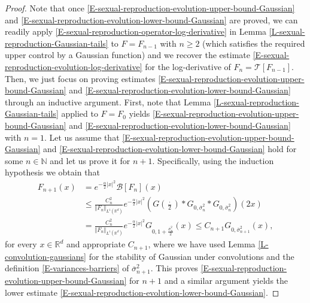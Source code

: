 \documentclass[reqno]{amsart}
\numberwithin{equation}{section}
\begin{document}
{\begin{proof} Note that once \eqref{E-sexual-reproduction-evolution-upper-bound-Gaussian} and \eqref{E-sexual-reproduction-evolution-lower-bound-Gaussian} are proved, we can readily apply \eqref{E-sexual-reproduction-operator-log-derivative} in Lemma \ref{L-sexual-reproduction-Gaussian-tails} to $F=F_{n-1}$ with $n\geq 2$  (which satisfies the required upper control by a Gaussian function) and we recover the estimate \eqref{E-sexual-reproduction-evolution-log-derivative} for the log-derivative of $F_n=\mathcal{T}[F_{n-1}]$. Then, we just focus on proving estimates \eqref{E-sexual-reproduction-evolution-upper-bound-Gaussian} and \eqref{E-sexual-reproduction-evolution-lower-bound-Gaussian} through an inductive argument. First, note that Lemma \ref{L-sexual-reproduction-Gaussian-tails} applied to $F=F_0$ yields  \eqref{E-sexual-reproduction-evolution-upper-bound-Gaussian} and \eqref{E-sexual-reproduction-evolution-lower-bound-Gaussian} with $n=1$. Let us assume that  \eqref{E-sexual-reproduction-evolution-upper-bound-Gaussian} and \eqref{E-sexual-reproduction-evolution-lower-bound-Gaussian} hold for some $n\in \mathbb{N}$ and let us prove it for $n+1$. Specifically, using the induction hypothesis we obtain that
\begin{align*}
F_{n+1}(x)&=e^{-\frac{\alpha}{2}\vert x\vert^2} \mathcal{B}[F_n](x)\\
&\leq \frac{C_n^2}{\Vert F_n\Vert_{L^1(\mathbb{R}^d)}}e^{-\frac{\alpha}{2}\vert x\vert^2} \left(G\left(\frac{\cdot}{2}\right)*G_{0,\overline{\sigma}_n^2}*G_{0,\overline{\sigma}_n^2}\right)(2x)\\
&= \frac{C_n^2}{\Vert F_n\Vert_{L^1(\mathbb{R}^d)}}e^{-\frac{\alpha}{2}\vert x\vert^2} G_{0,1+\frac{\overline{\sigma}_n^2}{2}}(x)\leq C_{n+1} G_{0,\overline{\sigma}_{n+1}^2}(x),
\end{align*}
for every $x\in \mathbb{R}^d$ and appropriate $C_{n+1}$, where we have used Lemma \ref{L-convolution-gaussians} for the stability of Gaussian under convolutions and the definition \eqref{E-variances-barriers} of $\overline{\sigma}_{n+1}^2$. This proves \eqref{E-sexual-reproduction-evolution-upper-bound-Gaussian} for $n+1$ and a similar argument yields the lower estimate \eqref{E-sexual-reproduction-evolution-lower-bound-Gaussian}.
\end{proof}

}
\end{document}

